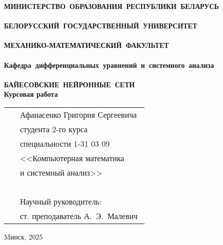 \setcounter{page}{1}
\thispagestyle{empty}
\begin{center}
\bf
\vspace{4cm}
{
\mbox{МИНИСТЕРСТВО~ОБРАЗОВАНИЯ~РЕСПУБЛИКИ~БЕЛАРУСЬ} \\~\\
\mbox{БЕЛОРУССКИЙ~ГОСУДАРСТВЕННЫЙ~УНИВЕРСИТЕТ} \\~\\
\mbox{МЕХАНИКО-МАТЕМАТИЧЕСКИЙ~ФАКУЛЬТЕТ} \\~\\
\mbox{Кафедра~дифференциальных~уравнений~и~системного~анализа} \\~\\
}
\vspace{4cm}
\bf
\mbox{БАЙЕСОВСКИЕ НЕЙРОННЫЕ СЕТИ}\\
\vspace{1cm}
\rm Курсовая работа
\vspace{3cm}
\end{center}

\begin{tabular}{ll}
\hspace{10.5cm}
&Афанасенко Григория Сергеевича~\\
&студента 2-го курса\\
&специальности 1-31 03 09\\
&<<Компьютерная математика\\
&и системный анализ>>\\~\\
&Научный руководитель:\\
&ст. преподаватель А.~Э.~Малевич
\end{tabular}
\vspace{4cm}
\begin{center}
    Mинск, 2025
\end{center}
\clearpage
\restoregeometry
